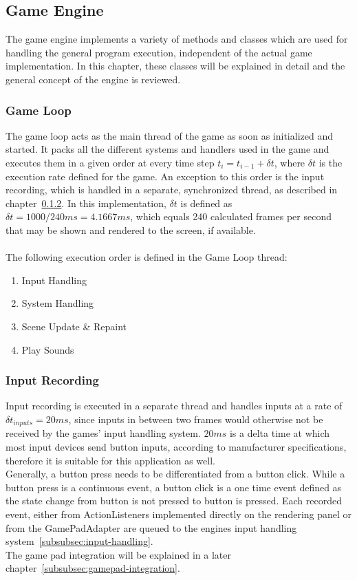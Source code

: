 \subsection{Game Engine}\label{subsec:game}
The game engine implements a variety of methods and classes which are used for handling the general program execution, independent of the actual game implementation.
In this chapter, these classes will be explained in detail and the general concept of the engine is reviewed.

\subsubsection{Game Loop}\label{subsubsec:game-loop}
The game loop acts as the main thread of the game as soon as initialized and started.
It packs all the different systems and handlers used in the game and executes them in a given order at every time step
$t_{i} = t_{i-1} + \delta t$, where $\delta t$ is the execution rate defined for the game.
An exception to this order is the input recording, which is handled in a separate, synchronized thread, as described in chapter~\ref{subsubsec:input-recording}.
In this implementation, $\delta t$ is defined as $\delta t = 1000 / 240 ms = 4.1667 ms$, which equals 240 calculated frames per second that may be shown and rendered
to the screen, if available.
\\ \\
The following execution order is defined in the Game Loop thread:
\begin{enumerate}
    \item Input Handling
    \item System Handling
    \item Scene Update \& Repaint
    \item Play Sounds
\end{enumerate}

\subsubsection{Input Recording}\label{subsubsec:input-recording}
Input recording is executed in a separate thread and handles inputs at a rate of $\delta t_{inputs} = 20 ms$, since inputs in between two frames
would otherwise not be received by the games' input handling system.
$20 ms$ is a delta time at which most input devices send button inputs, according to manufacturer specifications, therefore it is suitable for this application as well. 
\\
Generally, a button press needs to be differentiated from a button click.
While a button press is a continuous event, a button click is a one time event defined as the state change from button is not pressed to button is pressed.
Each recorded event, either from ActionListeners implemented directly on the rendering panel or from the GamePadAdapter are queued to the engines input handling system~\ref{subsubsec:input-handling}.
\\
The game pad integration will be explained in a later chapter~\ref{subsubsec:gamepad-integration}.
